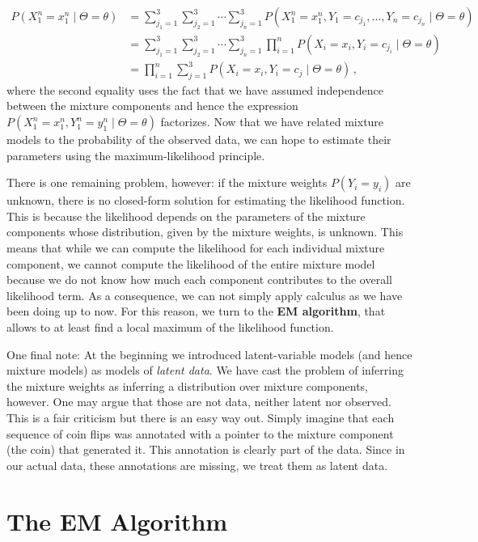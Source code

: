 \documentclass[11pt,leqno,a4paper]{report}\usepackage[]{graphicx}\usepackage[]{color}
\begin{document}
\begin{align}
P(X_1^n=x_{1}^{n} \mid \Theta= \theta) &= \sum_{j_1=1}^3 \sum_{j_2=1}^3 \cdots \sum_{j_n=1}^3 P(X_1^n=x_{1}^{n}, Y_1=c_{j_1}, \ldots, Y_n=c_{j_n} \mid \Theta= \theta) \label{eq:marginal} \\
&= \sum_{j_1=1}^3 \sum_{j_2=1}^3 \cdots \sum_{j_n=1}^3 \prod_{i=1}^{n} P(X_{i}=x_{i},Y_{i}=c_{j_i} \mid  \Theta= \theta) \nonumber \\
&= \prod_{i=1}^{n} \sum_{j=1}^3 P(X_{i}=x_{i},Y_{i}=c_{j} \mid  \Theta= \theta) \, , \nonumber
\end{align}
where the second equality uses the fact that we have assumed independence between the mixture components and hence
the expression $P(X_1^n=x_1^n, Y_1^n=y_1^n \mid \Theta = \theta)$ factorizes.
Now that we have related mixture models to the probability of the observed data, we can hope to estimate
their parameters using the maximum-likelihood principle.

There is one remaining problem, however: if the mixture weights $P(Y_i=y_i)$ are unknown, there is no closed-form solution for estimating the likelihood function. This is because
the likelihood depends on the parameters of the mixture components whose distribution, given
by the mixture weights, is unknown. This means that while we can compute the likelihood for each
individual mixture component, we cannot compute the likelihood of the entire mixture model because we
do not know how much each component contributes to the overall likelihood term. As a consequence, we can not 
simply apply calculus as we have been doing up to now. For this reason, we turn to the \textbf{EM algorithm}, 
that allows to at least find a local maximum of the likelihood function.

One final note: At the beginning we introduced latent-variable models (and hence mixture models) as models
of \textit{latent data}. We have cast the problem of inferring the mixture weights as inferring a 
distribution over mixture components, however. One may argue that those are not data, neither latent nor 
observed. This is a fair criticism but there is an easy way out. Simply imagine that each sequence of coin
flips was annotated with a pointer to the mixture component (the coin) that generated it. This annotation
is clearly part of the data. Since in our actual data, these annotations are missing, we treat them as 
latent data.

\section{The EM Algorithm}
\end{document}
